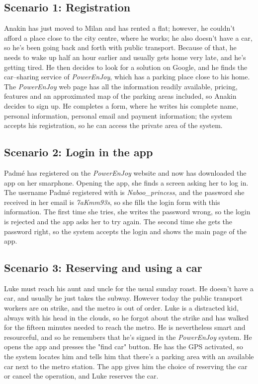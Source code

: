 \subsection{Scenario 1: Registration}
	Anakin has just moved to Milan and has rented a flat; however, he couldn't afford a place close to the city centre, where he works; he also doesn't have a car, so he's been going back and forth with public transport. Because of that, he needs to wake up half an hour earlier and usually gets home very late, and he's getting tired. He then decides to look for a solution on Google, and he finds the car–sharing service of \textit{PowerEnJoy}, which has a parking place close to his home. The \textit{PowerEnJoy} web page has all the information readily available, pricing, features and an approximated map of the parking areas included, so Anakin decides to sign up. He completes a form, where he writes his complete name, personal information, personal email and payment information; the system accepts his registration, so he can access the private area of the system. %
		
\subsection{Scenario 2: Login in the app}
	Padmé has registered on the \textit{PowerEnJoy} website and now has downloaded the app on her smarphone. Opening the app, she finds a screen asking her to log in. The username Padmé registered with is \textit{Naboo\_princess}, and the password she received in her email is \textit{7aKmm93s}, so she fills the login form with this information. The first time she tries, she writes the password wrong, so the login is rejected and the app asks her to try again. The second time she gets the password right, so the system accepts the login and shows the main page of the app.
	
\subsection{Scenario 3: Reserving and using a car}
	Luke must reach his aunt and uncle for the usual sunday roast. He doesn't have a car, and usually he just takes the subway. However today the public transport workers are on strike, and the metro is out of order. Luke is a distracted kid, always with his head in the clouds, so he forgot about the strike and has walked for the fifteen minutes needed to reach the metro. He is nevertheless smart and resourceful, and so he remembers that he's signed in the \textit{PowerEnJoy} system. He opens the app and presses the "find car" button. He has the GPS activated, so the system locates him and tells him that there's a parking area with an available car next to the metro station. The app gives him the choice of reserving the car or cancel the operation, and Luke reserves the car. 
	
